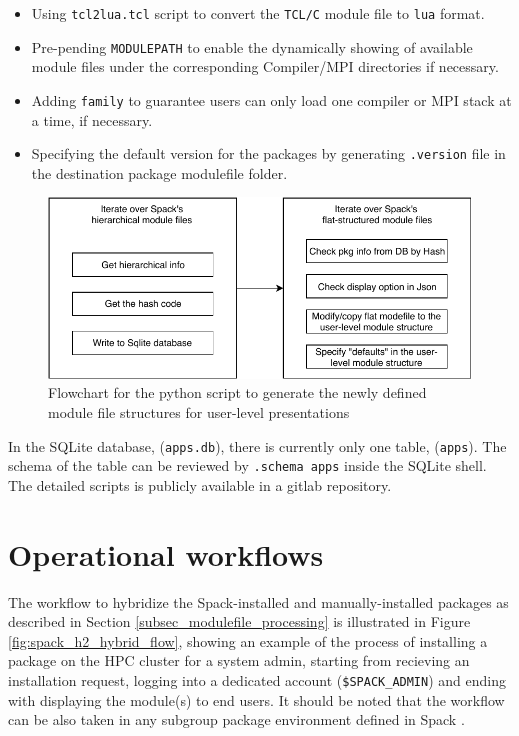 \documentclass[conference]{IEEEtran}
\begin{document}
\begin{itemize}
    \item Using \texttt{tcl2lua.tcl} script to convert the \texttt{TCL/C} module file to \texttt{lua} format.
    \item Pre-pending \texttt{MODULEPATH} to enable the dynamically showing of available module files under the corresponding Compiler/MPI directories if necessary.
    \item Adding \texttt{family} to guarantee users can only load one compiler or MPI stack at a time, if necessary.
    \item Specifying the default version for the packages by generating \texttt{.version} file in the destination package modulefile folder.
\end{itemize}

\begin{figure}[htbp]
  \centerline{\includegraphics[width=\linewidth]{figures/modulefilter_flowchart}}
  \caption{Flowchart for the python script to generate the newly defined module file structures for user-level presentations}
  \label{fig:modulefilter_flowchart}
\end{figure}

In the SQLite database, (\verb|apps.db|), there is currently only one table, (\verb|apps|). The schema of the table can be reviewed by \verb|.schema apps| inside the SQLite shell. The detailed scripts is publicly available in a gitlab repository\cite{gitlabrepo}.


\section{Operational workflows} \label{sec_workflow}

The workflow to hybridize the Spack-installed and manually-installed packages as described in Section \ref{subsec_modulefile_processing} is illustrated in Figure \ref{fig:spack_h2_hybrid_flow}, showing an example of the process of installing a package on the HPC cluster for a system admin, starting from recieving an installation request, logging into a dedicated account (\verb|$SPACK_ADMIN|) and ending with displaying the module(s) to end users. It should be noted that the workflow can be also taken in any subgroup package environment defined in Spack \cite{spack:20}.
\end{document}
